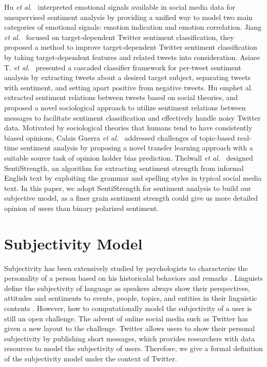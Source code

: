 \documentclass{acm_proc_article-sp}
\begin{document}
Hu \emph{et al.}~\cite{hu2013unsupervised} interpreted emotional signals available in social media data for unsupervised sentiment analysis by providing a unified way to model two main categories of emotional signals: emotion indication and emotion correlation. 
Jiang \emph{et al.}~\cite{jiang2011target} focused on target-dependent Twitter sentiment classification, they proposed a method to improve target-dependent Twitter sentiment classification by taking target-dependent features and related tweets into consideration. 
Asiaee T. \emph{et al.}~\cite{asiaee2012if} presented a cascaded classifier framework for per-tweet sentiment analysis by extracting tweets about a desired target subject, separating tweets with sentiment, and setting apart positive from negative tweets.
Hu emph{et al.}~\cite{hu2013exploiting} extracted sentiment relations between tweets based on social theories, and proposed a novel sociological approach to utilize sentiment relations between messages to facilitate sentiment classification and effectively handle noisy Twitter data.
Motivated by sociological theories that humans tend to have consistently biased opinions, Calais Guerra \emph{et al.}~\cite{calais2011bias} addressed challenges of topic-based real-time sentiment analysis by proposing a novel transfer learning approach with a suitable source task of opinion holder bias prediction.
Thelwall \emph{et al.}~\cite{thelwall2010sentiment,thelwall2012sentiment} designed SentiStrength, an algorithm for extracting sentiment strength from informal English text by exploiting the grammar and spelling styles in typical social media text.
In this paper, we adopt SentiStrength for sentiment analysis to build our subjective model, as a finer grain sentiment strength could give us more detailed opinion of users than binary polarized sentiment.

\section{Subjectivity Model}
\label{subjectivemodel}

Subjectivity has been extensively studied by psychologists to characterize the personality of a person based on his historicalal behaviors and remarks \cite{engbert2007agency}. 
Linguists define the subjectivity of language as speakers always show their perspectives, attitudes and sentiments to events, people, topics, and entities in their linguistic contents \cite{stein2005subjectivity}. 
However, how to computationally model the subjectivity of a user is still an open challenge. 
The advent of online social media such as Twitter has given a new layout to the challenge.  
Twitter allows users to show their personal subjectivity by publishing short messages, which provides researchers with data resources to model the subjectivity of users.
Therefore, we give a formal definition of the subjectivity model under the context of Twitter.
\end{document}
